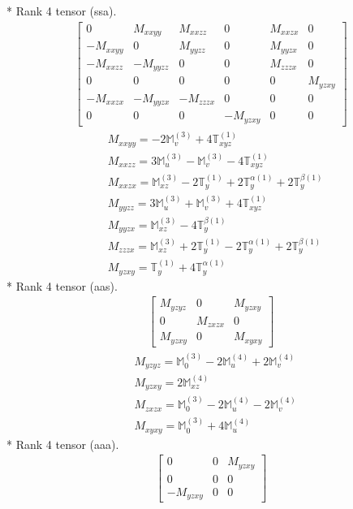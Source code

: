 \documentclass[fleqn,8pt,landscape]{jsarticle}
\begin{document}
* Rank 4 tensor (ssa).
\begin{align*}
\begin{bmatrix} 0 & M_{xxyy} & M_{xxzz} & 0 & M_{xxzx} & 0 \\ - M_{xxyy} & 0 & M_{yyzz} & 0 & M_{yyzx} & 0 \\ - M_{xxzz} & - M_{yyzz} & 0 & 0 & M_{zzzx} & 0 \\ 0 & 0 & 0 & 0 & 0 & M_{yzxy} \\ - M_{xxzx} & - M_{yyzx} & - M_{zzzx} & 0 & 0 & 0 \\ 0 & 0 & 0 & - M_{yzxy} & 0 & 0 \end{bmatrix}
\end{align*}
\begin{align*}
& M_{xxyy} = - 2 \mathbb{M}_{v}^{(3)} + 4 \mathbb{T}_{xyz}^{(1)} \\
& M_{xxzz} = 3 \mathbb{M}_{u}^{(3)} - \mathbb{M}_{v}^{(3)} - 4 \mathbb{T}_{xyz}^{(1)} \\
& M_{xxzx} = \mathbb{M}_{xz}^{(3)} - 2 \mathbb{T}_{y}^{(1)} + 2 \mathbb{T}_{y}^{\alpha(1)} + 2 \mathbb{T}_{y}^{\beta(1)} \\
& M_{yyzz} = 3 \mathbb{M}_{u}^{(3)} + \mathbb{M}_{v}^{(3)} + 4 \mathbb{T}_{xyz}^{(1)} \\
& M_{yyzx} = \mathbb{M}_{xz}^{(3)} - 4 \mathbb{T}_{y}^{\beta(1)} \\
& M_{zzzx} = \mathbb{M}_{xz}^{(3)} + 2 \mathbb{T}_{y}^{(1)} - 2 \mathbb{T}_{y}^{\alpha(1)} + 2 \mathbb{T}_{y}^{\beta(1)} \\
& M_{yzxy} = \mathbb{T}_{y}^{(1)} + 4 \mathbb{T}_{y}^{\alpha(1)}
\end{align*}
* Rank 4 tensor (aas).
\begin{align*}
\begin{bmatrix} M_{yzyz} & 0 & M_{yzxy} \\ 0 & M_{zxzx} & 0 \\ M_{yzxy} & 0 & M_{xyxy} \end{bmatrix}
\end{align*}
\begin{align*}
& M_{yzyz} = \mathbb{M}_{0}^{(3)} - 2 \mathbb{M}_{u}^{(4)} + 2 \mathbb{M}_{v}^{(4)} \\
& M_{yzxy} = 2 \mathbb{M}_{xz}^{(4)} \\
& M_{zxzx} = \mathbb{M}_{0}^{(3)} - 2 \mathbb{M}_{u}^{(4)} - 2 \mathbb{M}_{v}^{(4)} \\
& M_{xyxy} = \mathbb{M}_{0}^{(3)} + 4 \mathbb{M}_{u}^{(4)}
\end{align*}
* Rank 4 tensor (aaa).
\begin{align*}
\begin{bmatrix} 0 & 0 & M_{yzxy} \\ 0 & 0 & 0 \\ - M_{yzxy} & 0 & 0 \end{bmatrix}
\end{align*}
\end{document}
